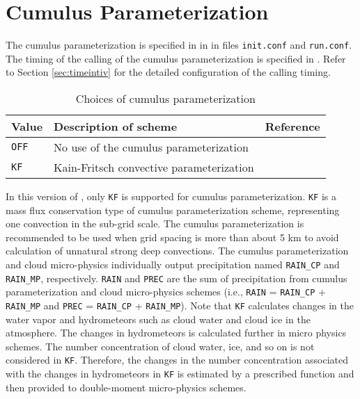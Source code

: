 
\section{Cumulus Parameterization} \label{sec:basic_usel_cumulus}

The cumulus parameterization is specified in  in  in files \verb|init.conf| and \verb|run.conf|. The timing of the calling of the cumulus parameterization is specified in . Refer to Section \ref{sec:timeintiv} for the detailed configuration of the calling timing.

\begin{table}[h]
\begin{center}
  \caption{Choices of cumulus parameterization}
  \label{tab:nml_atm_cp}
  \begin{tabularx}{150mm}{lXX} \hline
    \rowcolor[gray]{0.9}  Value & Description of scheme & Reference\\ \hline
      \verb|OFF|  & No use of the cumulus parameterization &  \\
      \verb|KF|   & Kain-Fritsch convective parameterization & \citet{kain_1990,kain_2004} \\
    \hline
  \end{tabularx}
\end{center}
\end{table}

In this version of \scalerm, only \verb|KF| is supported for cumulus parameterization. \verb|KF| is a mass flux conservation type of cumulus parameterization scheme, representing one convection in the sub-grid scale.
The cumulus parameterization is recommended to be used when grid spacing is more than about 5 km to avoid calculation of unnatural strong deep convections.
The cumulus parameterization and cloud micro-physics individually output
precipitation named \verb|RAIN_CP| and \verb|RAIN_MP|, respectively.
\verb|RAIN| and \verb|PREC| are the sum of precipitation
from cumulus parameterization and cloud micro-physics schemes
(i.e., \verb|RAIN| = \verb|RAIN_CP| + \verb|RAIN_MP|
and \verb|PREC| = \verb|RAIN_CP| + \verb|RAIN_MP|).
Note that \verb|KF| calculates changes in the water vapor and
hydrometeors such as cloud water and cloud ice in the atmosphere.
The changes in hydrometeors is calculated further in micro physics schemes.
The number concentration of cloud water, ice, and so on
is not considered in \verb|KF|.
Therefore,
the changes in the number concentration
associated with the changes in hydrometeors in \verb|KF|
is estimated by a prescribed function
and then
provided to double-moment micro-physics schemes.



